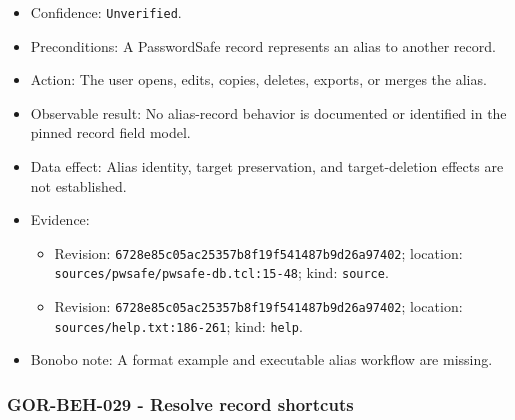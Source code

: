 \documentclass[
  letterpaper,
]{article}
\newcommand{\passthrough}[1]{#1}
\providecommand{\tightlist}{%
  \setlength{\itemsep}{0pt}\setlength{\parskip}{0pt}}
\begin{document}
\begin{itemize}
\tightlist
\item
  Confidence: \nolinkurl{Unverified}.
\item
  Preconditions: A PasswordSafe record represents an alias to another record.
\item
  Action: The user opens, edits, copies, deletes, exports, or merges the alias.
\item
  Observable result: No alias-record behavior is documented or identified in the pinned record field model.
\item
  Data effect: Alias identity, target preservation, and target-deletion effects are not established.
\item
  Evidence:

  \begin{itemize}
  \tightlist
  \item
    Revision: \nolinkurl{6728e85c05ac25357b8f19f541487b9d26a97402}; location:
    \nolinkurl{sources/pwsafe/pwsafe-db.tcl:15-48}; kind: \passthrough{\lstinline!source!}.
  \item
    Revision: \nolinkurl{6728e85c05ac25357b8f19f541487b9d26a97402}; location: \nolinkurl{sources/help.txt:186-261};
    kind: \passthrough{\lstinline!help!}.
  \end{itemize}
\item
  Bonobo note: A format example and executable alias workflow are missing.
\end{itemize}

\subsubsection{GOR-BEH-029 - Resolve record shortcuts}\label{gor-beh-029---resolve-record-shortcuts}
\end{document}
